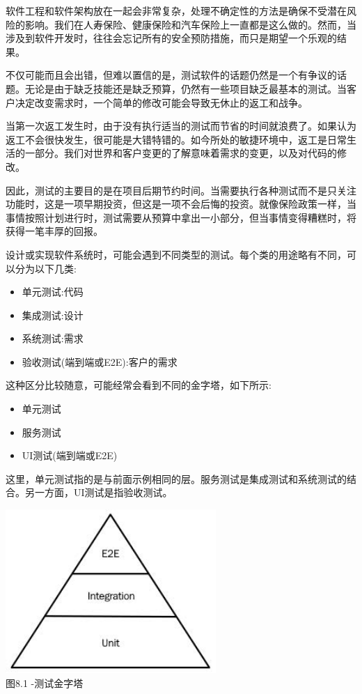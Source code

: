 
软件工程和软件架构放在一起会非常复杂，处理不确定性的方法是确保不受潜在风险的影响。我们在人寿保险、健康保险和汽车保险上一直都是这么做的。然而，当涉及到软件开发时，往往会忘记所有的安全预防措施，而只是期望一个乐观的结果。

不仅可能而且会出错，但难以置信的是，测试软件的话题仍然是一个有争议的话题。无论是由于缺乏技能还是缺乏预算，仍然有一些项目缺乏最基本的测试。当客户决定改变需求时，一个简单的修改可能会导致无休止的返工和战争。

当第一次返工发生时，由于没有执行适当的测试而节省的时间就浪费了。如果认为返工不会很快发生，很可能是大错特错的。如今所处的敏捷环境中，返工是日常生活的一部分。我们对世界和客户变更的了解意味着需求的变更，以及对代码的修改。

因此，测试的主要目的是在项目后期节约时间。当需要执行各种测试而不是只关注功能时，这是一项早期投资，但这是一项不会后悔的投资。就像保险政策一样，当事情按照计划进行时，测试需要从预算中拿出一小部分，但当事情变得糟糕时，将获得一笔丰厚的回报。


设计或实现软件系统时，可能会遇到不同类型的测试。每个类的用途略有不同，可以分为以下几类:

\begin{itemize}
\item 
单元测试:代码

\item 
集成测试:设计

\item 
系统测试:需求

\item 
验收测试(端到端或E2E):客户的需求
\end{itemize}

这种区分比较随意，可能经常会看到不同的金字塔，如下所示:

\begin{itemize}
\item 
单元测试

\item 
服务测试

\item 
UI测试(端到端或E2E)
\end{itemize}

这里，单元测试指的是与前面示例相同的层。服务测试是集成测试和系统测试的结合。另一方面，UI测试是指验收测试。

\begin{center}
\includegraphics[width=0.6\textwidth]{content/3/chapter8/images/1.jpg}\\
图8.1 -测试金字塔
\end{center}

